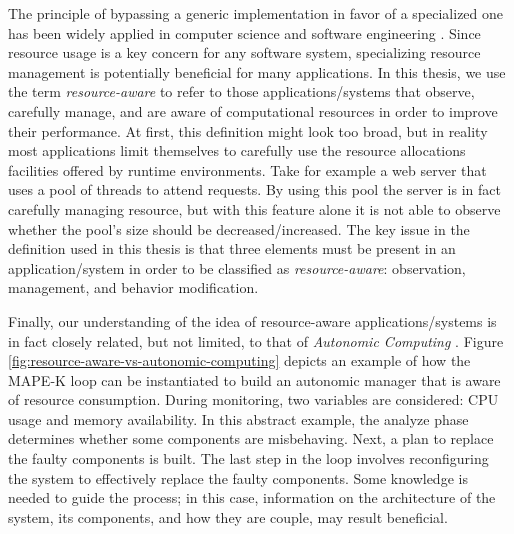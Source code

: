 The principle of bypassing a generic implementation in favor of a specialized one has been widely applied in computer science and software engineering \cite{engler1995exokernel, Munro1996,Dragos:2009:CGT:1565824.1565830,Marinos:2014:NSS:2619239.2626311}.
Since resource usage is a key concern for any software system, specializing resource management is potentially beneficial for many applications.
In this thesis, we use the term \textit{resource-aware} to refer to those applications/systems that observe, carefully manage, and are aware of computational resources in order to improve their performance. 
At first, this definition might look too broad, but in reality most applications limit themselves to carefully use the resource allocations facilities offered by runtime environments.
Take for example a web server that uses a pool of threads to attend requests.
By using this pool the server is in fact carefully managing resource, but with this feature alone it is not able to observe whether the pool's size should be decreased/increased.
The key issue in the definition used in this thesis is that three elements must be present in an application/system in order to be classified as \textit{resource-aware}: observation, management, and behavior modification.

 
Finally, our understanding of the idea of resource-aware applications/systems is in fact closely related, but not limited, to that of \textit{Autonomic Computing} \cite{Horn2001,kephart03,Brun:2009:ESS:1573856.1573860}.
Figure \ref{fig:resource-aware-vs-autonomic-computing} depicts an example of how the MAPE-K loop can be instantiated to build an autonomic manager that is aware of resource consumption.
During monitoring, two variables are considered: CPU usage and memory availability.
In this abstract example, the analyze phase determines whether some components are misbehaving.
Next, a plan to replace the faulty components is built.
The last step in the loop involves reconfiguring the system to effectively replace the faulty components.
Some knowledge is needed to guide the process; in this case, information on the architecture of the system, its components, and how they are couple, may result beneficial.


